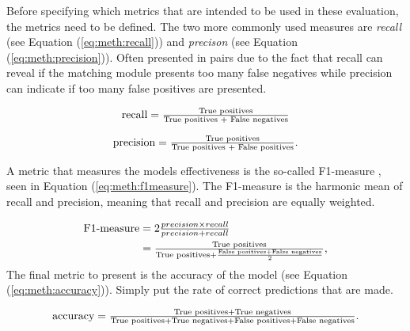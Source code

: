 Before specifying which metrics that are intended to be used in these evaluation, the metrics need to be defined. The two more commonly used measures are \emph{recall} (see Equation (\ref{eq:meth:recall})) and \emph{precison} (see Equation (\ref{eq:meth:precision})). Often presented in pairs due to the fact that recall can reveal if the matching module presents too many false negatives while precision can indicate if too many false positives are presented. 

\begin{equation}
\label{eq:meth:recall}
\textnormal{recall} = \tfrac{\textnormal{True positives}}{\textnormal{True positives } + \textnormal{ False negatives}}
\end{equation}

\begin{equation}
\label{eq:meth:precision}
\textnormal{precision} = \tfrac{\textnormal{True positives}}{\textnormal{True positives } + \textnormal{ False positives}}.
\end{equation}

A metric that measures the models effectiveness is the so-called F1-measure \cite{powers2011evaluation}, seen in Equation (\ref{eq:meth:f1measure}). The F1-measure is the harmonic mean of recall and precision, meaning that recall and precision are equally weighted. 

\begin{equation}
\label{eq:meth:f1measure}
\begin{split}
\textnormal{F1-measure} &= 2 \tfrac{precision \times recall}{precision + recall}\\
&= \tfrac{\textnormal{True positives}}{\textnormal{True positives} +\frac{\textnormal{False positives}+\textnormal{False negatives}}{2}},
\end{split}
\end{equation}
The final metric to present is the accuracy of the model (see Equation (\ref{eq:meth:accuracy})). Simply put the rate of correct predictions that are made. 

\begin{equation}
\label{eq:meth:accuracy}
\textnormal{accuracy} = \tfrac{\textnormal{True positives} + \textnormal{True negatives}}{\textnormal{True positives} + \textnormal{True negatives}+ \textnormal{False positives} + \textnormal{False negatives}}.
\end{equation}


